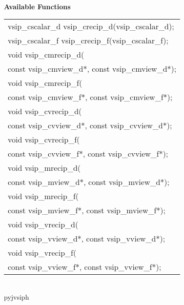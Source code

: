 \\\cvsiplh
\newline \hspace*{.8cm} \vspace*{.1cm} \textbf{Available Functions }
\newline \hspace*{1.1cm} {
\ttfamily
\begin{tabular}[H]{l}
vsip\_cscalar\_d vsip\_crecip\_d(vsip\_cscalar\_d);\\
vsip\_cscalar\_f vsip\_crecip\_f(vsip\_cscalar\_f);\\
void vsip\_cmrecip\_d(\\*\hspace{.6cm}const vsip\_cmview\_d*, const vsip\_cmview\_d*);\\
void vsip\_cmrecip\_f(\\*\hspace{.6cm}const vsip\_cmview\_f*, const vsip\_cmview\_f*);\\
void vsip\_cvrecip\_d(\\*\hspace{.6cm}const vsip\_cvview\_d*, const vsip\_cvview\_d*);\\
void vsip\_cvrecip\_f(\\*\hspace{.6cm}const vsip\_cvview\_f*, const vsip\_cvview\_f*);\\
void vsip\_mrecip\_d(\\*\hspace{.6cm}const vsip\_mview\_d*, const vsip\_mview\_d*);\\
void vsip\_mrecip\_f(\\*\hspace{.6cm}const vsip\_mview\_f*, const vsip\_mview\_f*);\\
void vsip\_vrecip\_d(\\*\hspace{.6cm}const vsip\_vview\_d*, const vsip\_vview\_d*);\\
void vsip\_vrecip\_f(\\*\hspace{.6cm}const vsip\_vview\_f*, const vsip\_vview\_f*);\\
\end{tabular}
}
\\pyjvsiph